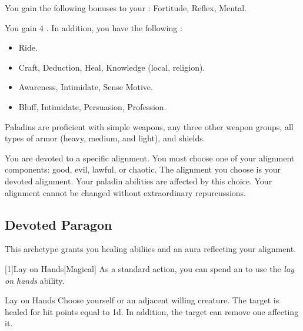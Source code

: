         You gain the following bonuses to your :  Fortitude,  Reflex,  Mental.

        You gain 4 .
        In addition, you have the following :
        \begin{itemize}
            \item {} Ride.
            \item {} Craft, Deduction, Heal, Knowledge (local, religion).
            \item {} Awareness, Intimidate, Sense Motive.
            \item {} Bluff, Intimidate, Persuasion, Profession.
        \end{itemize}

        Paladins are proficient with simple weapons, any three other weapon groups, all types of armor (heavy, medium, and light), and shields.

        You are devoted to a specific alignment.
        You must choose one of your alignment components: good, evil, lawful, or chaotic.
        The alignment you choose is your devoted alignment.
        Your paladin abilities are affected by this choice.
        Your alignment cannot be changed without extraordinary repurcussions.

    \subsection{Devoted Paragon}
        This archetype grants you healing abiliies and an aura reflecting your alignment.

        [1]{Lay on Hands}[Magical] As a standard action, you can spend an  to use the \textit{lay on hands} ability.
        \begin{ability}{Lay on Hands}
            Choose yourself or an adjacent willing creature.
            The target is healed for hit points equal to  \plus1d.
            In addition, the target can remove one  affecting it.
        \end{ability}

